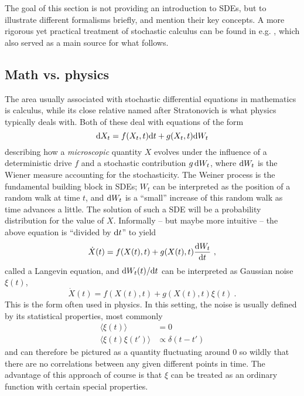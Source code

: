 The goal of this section is not providing an introduction to SDEs, but to illustrate different formalisms briefly, and mention their key concepts. A more rigorous yet practical treatment of stochastic calculus can be found in e.g. \cite{sde}, which also served as a main source for what follows.

\subsection{Math vs. physics}
\label{sec:math vs physics}

The area usually associated with stochastic differential equations in mathematics is \Ito{} calculus, while its close relative named after Stratonovich is what physics typically deals with. Both of these deal with equations of the form
%
\begin{equation}
	\label{eqn:sde}
	\mathrm{d} X_t = f(X_t,t) \mathrm{d} t + g(X_t,t) \mathrm{d} W_t
\end{equation}
%
describing how a \emph{microscopic} quantity \(X\) evolves under the influence of a deterministic drive \(f\) and a stochastic contribution \(g\,\mathrm{d} W_t\), where \(\mathrm{d} W_t\) is the Wiener measure accounting for the stochasticity. The Weiner process is the fundamental building block in SDEs; \(W_t\) can be interpreted as the position of a random walk at time \(t\), and \(\mathrm{d} W_t\) is a ``small'' increase of this random walk as time advances a little. The solution of such a SDE will be a probability distribution for the value of \(X\).
Informally -- but maybe more intuitive -- the above equation is ``divided by \(\mathrm{d} t\)'' to yield
%
\begin{equation}
	\dot X(t) = f(X(t),t) + g(X(t),t)\frac{\mathrm{d} W_t}{\mathrm{d} t} ~,
\end{equation}
%
called a Langevin equation, and \(\mathrm{d} W_t(t)/\mathrm{d} t\) can be interpreted as Gaussian noise \(\xi(t)\),
\begin{equation}
	\dot X(t) = f(X(t),t) + g(X(t),t)\xi(t)~.
\end{equation}
%
This is the form often used in physics. In this setting, the noise is usually defined by its statistical properties, most commonly
\begin{align}
	\langle\xi(t)\rangle &= 0 \\
	\langle\xi(t)\xi(t')\rangle &\propto \delta(t-t')
\end{align}
%
and can therefore be pictured as a quantity fluctuating around \(0\) so wildly that there are no correlations between any given different points in time. The advantage of this approach of course is that \(\xi\) can be treated as an ordinary function with certain special properties.



